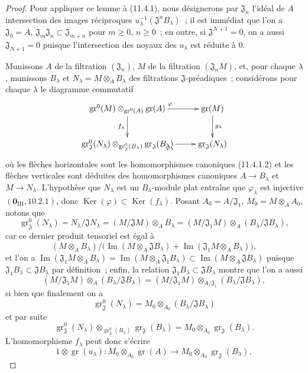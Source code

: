 \begin{proof}
Pour appliquer ce lemme à (11.4.1), nous désignerons par $\mathfrak J_n$
l'idéal de $A$ intersection des images réciproques
$u_\lambda^{-1}(\mathfrak J^nB_\lambda)$~; il est immédiat que l'on a
$\mathfrak J_0=A$, $\mathfrak J_m\mathfrak J_n\subset\mathfrak J_{m+n}$ pour
$m\geq0$, $n\geq0$~; en outre, si $\mathfrak J^{N+1}=0$, on a aussi
$\mathfrak J_{N+1}=0$ puisque l'intersection des noyaux des $u_\lambda$ est
réduite à $0$.

Munissons $A$ de la filtration $(\mathfrak J_n)$, $M$ de la filtration
$(\mathfrak J_nM)$, et, pour chaque $\lambda$, munissons $B_\lambda$ et
$N_\lambda=M\otimes_A B_\lambda$ des filtrations $\mathfrak J$-préadiques~;
considérons pour chaque $\lambda$ le diagramme commutatif
\[
\xymatrix{
\operatorname{gr}^0(M)\otimes_{\operatorname{gr}^0(A)}\operatorname{gr}(A)
 \ar[r]^{\varphi} \ar[d]_{f_\lambda} & \operatorname{gr}(M) \ar[d]^{g_\lambda} \\
\operatorname{gr}_{\mathfrak J}^0(N_\lambda)
 \otimes_{\operatorname{gr}_{\mathfrak J}^0(B_\lambda)}
 \operatorname{gr}_{\mathfrak J}(B_\lambda)
 \ar[r]_{\varphi_\lambda} & \operatorname{gr}_{\mathfrak J}(N_\lambda)
}
\]
où les flèches horizontales sont les homomorphismes canoniques (11.4.1.2) et
les flèches verticales sont déduites des homomorphismes canoniques
$A\to B_\lambda$ et $M\to N_\lambda$. L'hypothèse que $N_\lambda$ est un
$B_\lambda$-module plat entraîne que $\varphi_\lambda$ est injective
$(\mathbf 0_{\mathrm{III}},10.2.1)$, donc
$\operatorname{Ker}(\varphi)\subset\operatorname{Ker}(f_\lambda)$. Posant
$A_0=A/\mathfrak J_1$, $M_0=M\otimes_A A_0$, notons que
\[
\operatorname{gr}_{\mathfrak J}^0(N_\lambda)
=N_\lambda/\mathfrak JN_\lambda
=(M/\mathfrak JM)\otimes_A B_\lambda
=(M/\mathfrak J_1M)\otimes_A(B_\lambda/\mathfrak JB_\lambda),
\]
car ce dernier produit tensoriel est égal à
\[
(M\otimes_A B_\lambda)\Big/
\big(\operatorname{Im}(M\otimes_A\mathfrak JB_\lambda)
 +\operatorname{Im}(\mathfrak J_1M\otimes_A B_\lambda)\big),
\]
et l'on a
$\operatorname{Im}(\mathfrak J_1M\otimes_A B_\lambda)
=\operatorname{Im}(M\otimes_A\mathfrak J_1B_\lambda)
\subset\operatorname{Im}(M\otimes_A\mathfrak JB_\lambda)$ puisque
$\mathfrak J_1B_\lambda\subset\mathfrak JB_\lambda$ par définition~; enfin,
la relation $\mathfrak J_1B_\lambda\subset\mathfrak JB_\lambda$ montre que l'on
a aussi
\[
(M/\mathfrak J_1M)\otimes_A(B_\lambda/\mathfrak JB_\lambda)
=(M/\mathfrak J_1M)\otimes_{A/\mathfrak J_1}
 (B_\lambda/\mathfrak JB_\lambda),
\]
si bien que finalement on a
\[
\operatorname{gr}_{\mathfrak J}^0(N_\lambda)
=M_0\otimes_{A_0}(B_\lambda/\mathfrak JB_\lambda)
\]
et par suite
\[
\operatorname{gr}_{\mathfrak J}^0(N_\lambda)
\otimes_{\operatorname{gr}_{\mathfrak J}^0(B_\lambda)}
\operatorname{gr}_{\mathfrak J}(B_\lambda)
=M_0\otimes_{A_0}\operatorname{gr}_{\mathfrak J}(B_\lambda).
\]
L'homomorphisme $f_\lambda$ peut donc s'écrire
\[
1\otimes\operatorname{gr}(u_\lambda):
M_0\otimes_{A_0}\operatorname{gr}(A)
\longrightarrow M_0\otimes_{A_0}\operatorname{gr}_{\mathfrak J}(B_\lambda),
\]


\end{proof}
